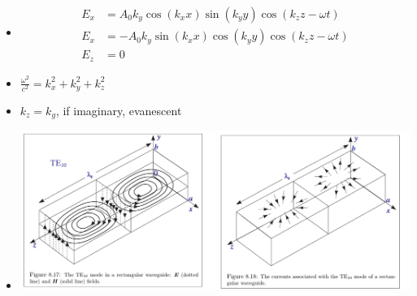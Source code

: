 \documentclass{article}
\theoremstyle{remark}
\theoremstyle{remark}
\begin{document}
\begin{enumerate}
\begin{itemize}
            \item \begin{align*}
                    E_x &= A_0k_y\cos(k_x x)\sin(k_y y)\cos(k_z z-\omega t)\\
                    E_x &= -A_0k_y\sin(k_x x)\cos(k_y y)\cos(k_z z-\omega t)\\
                    E_z&=0
                \end{align*}
            \item $\frac{\omega^2}{c^2}=k_x^2+k_y^2+k_z^2$
            \item $k_z=k_g$, if imaginary, evanescent
            \item \includegraphics*[width=\linewidth]{rect_waveguide.png}
        \end{itemize}
\end{enumerate}
\end{document}
